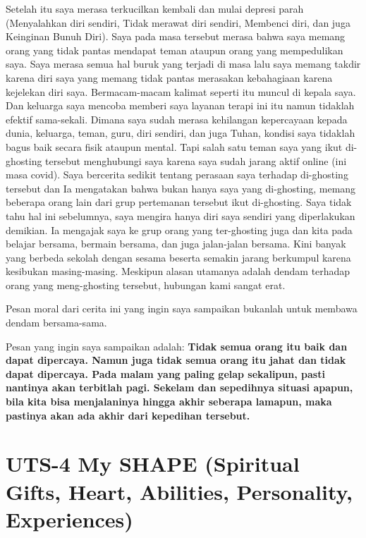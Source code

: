 \documentclass[
  letterpaper,
  DIV=11,
  numbers=noendperiod]{scrreprt}
\begin{document}
Setelah itu saya merasa terkucilkan kembali dan mulai depresi parah
(Menyalahkan diri sendiri, Tidak merawat diri sendiri, Membenci diri,
dan juga Keinginan Bunuh Diri). Saya pada masa tersebut merasa bahwa
saya memang orang yang tidak pantas mendapat teman ataupun orang yang
mempedulikan saya. Saya merasa semua hal buruk yang terjadi di masa lalu
saya memang takdir karena diri saya yang memang tidak pantas merasakan
kebahagiaan karena kejelekan diri saya. Bermacam-macam kalimat seperti
itu muncul di kepala saya. Dan keluarga saya mencoba memberi saya
layanan terapi ini itu namun tidaklah efektif sama-sekali. Dimana saya
sudah merasa kehilangan kepercayaan kepada dunia, keluarga, teman, guru,
diri sendiri, dan juga Tuhan, kondisi saya tidaklah bagus baik secara
fisik ataupun mental. Tapi salah satu teman saya yang ikut di-ghosting
tersebut menghubungi saya karena saya sudah jarang aktif online (ini
masa covid). Saya bercerita sedikit tentang perasaan saya terhadap
di-ghosting tersebut dan Ia mengatakan bahwa bukan hanya saya yang
di-ghosting, memang beberapa orang lain dari grup pertemanan tersebut
ikut di-ghosting. Saya tidak tahu hal ini sebelumnya, saya mengira hanya
diri saya sendiri yang diperlakukan demikian. Ia mengajak saya ke grup
orang yang ter-ghosting juga dan kita pada belajar bersama, bermain
bersama, dan juga jalan-jalan bersama. Kini banyak yang berbeda sekolah
dengan sesama beserta semakin jarang berkumpul karena kesibukan
masing-masing. Meskipun alasan utamanya adalah dendam terhadap orang
yang meng-ghosting tersebut, hubungan kami sangat erat.

Pesan moral dari cerita ini yang ingin saya sampaikan bukanlah untuk
membawa dendam bersama-sama.

Pesan yang ingin saya sampaikan adalah: \textbf{Tidak semua orang itu
baik dan dapat dipercaya. Namun juga tidak semua orang itu jahat dan
tidak dapat dipercaya. Pada malam yang paling gelap sekalipun, pasti
nantinya akan terbitlah pagi. Sekelam dan sepedihnya situasi apapun,
bila kita bisa menjalaninya hingga akhir seberapa lamapun, maka pastinya
akan ada akhir dari kepedihan tersebut.}


\chapter{UTS-4 My SHAPE (Spiritual Gifts, Heart, Abilities, Personality,
Experiences)}\label{uts-4-my-shape-spiritual-gifts-heart-abilities-personality-experiences}
\end{document}
